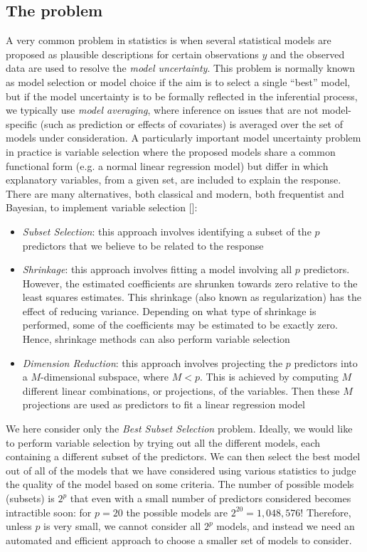 \documentclass[11 pt]{article}
\begin{document}
\begin{multicols}{2}
\section{The problem}

A very common problem in statistics is when several statistical models are proposed as plausible descriptions for certain observations $y$ and the observed data are used to resolve the \textit{model uncertainty}. This problem is normally known as model selection or model choice if the aim is to select a single “best” model, but if the model uncertainty is to be formally reflected in the inferential process, we typically use \textit{model averaging}, where inference on issues that are not model-specific (such as prediction or effects of covariates) is averaged over the set of models under consideration. A particularly important model uncertainty problem in practice is variable selection where the proposed models share a common functional form (e.g. a normal linear regression model) but differ in which explanatory variables, from a given set, are included to explain the response. There are many alternatives, both classical and modern, both frequentist and Bayesian, to implement variable selection [\cite{ISL}]:

\begin{itemize}
    \item \textit{Subset Selection}: this approach involves identifying a subset of the $p$ predictors that we believe to be related to the response
    \item  \textit{Shrinkage}: this approach involves fitting a model involving all $p$ predictors. However, the estimated coefficients are shrunken towards zero relative to the least squares estimates. This shrinkage (also known as regularization) has the effect of reducing variance. Depending on what type of shrinkage is performed, some of the coefficients may be estimated to be exactly zero. Hence, shrinkage methods can also perform variable selection
    \item \textit{Dimension Reduction}: this approach involves projecting the $p$ predictors into a $M$-dimensional subspace, where $M<p$. This is achieved by computing $M$ different linear combinations, or projections, of the variables. Then these $M$ projections are used as predictors to fit a linear regression model
\end{itemize}

We here consider only the \textit{Best Subset Selection} problem. Ideally, we would like to perform variable selection by trying out all the different models, each containing a different subset of the predictors. We can then select the best model out of all of the models that we have considered using various statistics  to judge the quality of the model based on some criteria. The number of possible models (subsets) is $2^p$ that even with a small number of predictors considered becomes intractible soon: for $p = 20$ the possible models are $2^{20} = 1,048,576$! Therefore, unless $p$ is very small, we cannot consider all $2^p$ models, and instead we need an automated and efficient approach to choose a smaller set of models to consider.



\end{multicols}
\end{document}

